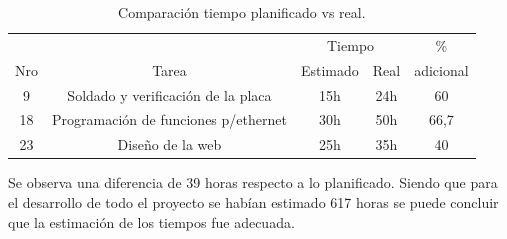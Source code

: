 \begin{table}[hp]
  \begin{tabular}{|c|c|c|c|c|}
    \hline
       &       & \multicolumn{2}{c|}{ Tiempo} & \%  \\ \cline{3-4}
    Nro& Tarea &       Estimado &  Real       & adicional \\
    \hline
    9 & Soldado y verificación de la placa & 15h & 24h & 60 \\
    18 & Programación de funciones p/ethernet & 30h & 50h & 66,7 \\
    23 & Diseño de la web & 25h & 35h & 40 \\
    \hline \hline
  \end{tabular}
  \caption{Comparación tiempo planificado vs real.}
  \label{tab:update_task}
\end{table}

Se observa una diferencia de 39 horas respecto a lo planificado. Siendo que para el desarrollo de todo el proyecto se habían estimado 617 horas se puede concluir que la estimación de los tiempos fue adecuada. 
